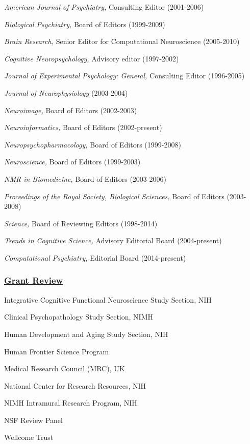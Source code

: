 \documentclass[10 pt]{article}
\begin{document}
\textit{American Journal of Psychiatry,} Consulting Editor (2001-2006)

\textit{Biological Psychiatry,} Board of Editors (1999-2009)

\textit{Brain Research,} Senior Editor for Computational Neuroscience (2005-2010)

\textit{Cognitive Neuropsychology,} Advisory editor (1997-2002)

\textit{Journal of Experimental Psychology: General,} Consulting Editor (1996-2005)

\textit{Journal of Neurophysiology} (2003-2004)

\textit{Neuroimage,} Board of Editors (2002-2003)

\textit{Neuroinformatics,} Board of Editors (2002-present)

\textit{Neuropsychopharmacology,} Board of Editors (1999-2008)

\textit{Neuroscience,} Board of Editors (1999-2003)

\textit{NMR in Biomedicine,} Board of Editors (2003-2006)

\textit{Proceedings of the Royal Society, Biological Sciences,} Board of Editors (2003-2008)

\textit{Science,} Board of Reviewing Editors (1998-2014)

\textit{Trends in Cognitive Science,} Advisory Editorial Board (2004-present)

\textit{Computational Psychiatry,} Editorial Board (2014-present)


\subsubsection*{\underline{Grant Review}} \label{secGR}
    \smallskip

Integrative Cognitive Functional Neuroscience Study Section, NIH

Clinical Psychopathology Study Section, NIMH

Human Development and Aging Study Section, NIH

Human Frontier Science Program

Medical Research Council (MRC), UK

National Center for Research Resources, NIH

NIMH Intramural Research Program, NIH

NSF Review Panel

Wellcome Trust


\end{document}
